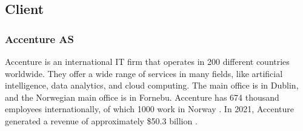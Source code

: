 \subsection{Client}
\subsubsection*{Accenture AS}

Accenture is an international IT firm that operates in 200 different countries worldwide. They offer a wide range of services in many fields, like artificial intelligence, data analytics, and cloud computing. The main office is in Dublin, and the Norwegian main office is in Fornebu. Accenture has 674 thousand employees internationally, of which 1000 work in Norway \parencite{accenture_earning_report_2021}. In 2021, Accenture generated a revenue of approximately \$50.3 billion \parencite{accenture_about}.

